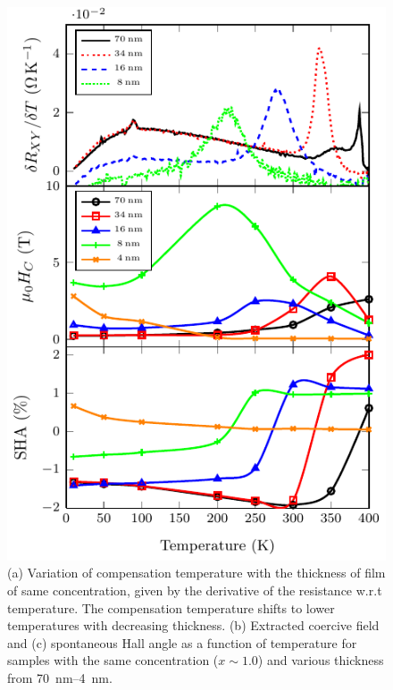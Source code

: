 \documentclass[reprint,aip,apl,floatfix,linenumbers,superscriptaddress]{revtex4-1}
\begin{document}
\begin{figure}
\includegraphics[width=1.0\columnwidth]{Transport-Fig4.pdf}
\caption{(a) Variation of compensation temperature with the thickness of  film of same  concentration, given by the derivative of the resistance w.r.t temperature. The compensation temperature shifts to lower temperatures with decreasing thickness. (b) Extracted coercive field and (c) spontaneous Hall angle as a function of temperature for samples with the same  concentration ($x \sim \num{1.0}$) and various thickness from \SIrange{70}{4}{\nano\metre}.}
\label{fig:strain}
\end{figure}
\end{document}
